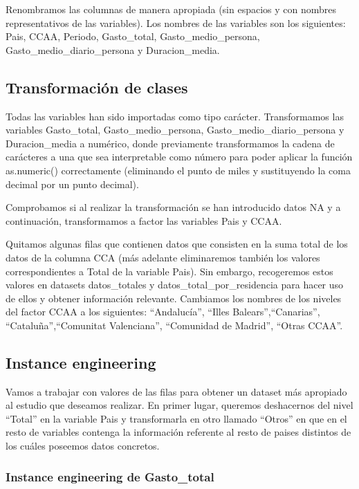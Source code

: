 \documentclass[data,article,submit,moreauthors,pdftex]{Definitions/mdpi}
\begin{document}
Renombramos las columnas de manera apropiada (sin espacios y con nombres
representativos de las variables). Los nombres de las variables son los
siguientes: Pais, CCAA, Periodo, Gasto\_total, Gasto\_medio\_persona,
Gasto\_medio\_diario\_persona y Duracion\_media.

\subsection{Transformación de clases}\label{transformaciuxf3n-de-clases}

Todas las variables han sido importadas como tipo carácter.
Transformamos las variables Gasto\_total, Gasto\_medio\_persona,
Gasto\_medio\_diario\_persona y Duracion\_media a numérico, donde
previamente transformamos la cadena de carácteres a una que sea
interpretable como número para poder aplicar la función as.numeric()
correctamente (eliminando el punto de miles y sustituyendo la coma
decimal por un punto decimal).

Comprobamos si al realizar la transformación se han introducido datos NA
y a continuación, transformamos a factor las variables Pais y CCAA.

Quitamos algunas filas que contienen datos que consisten en la suma
total de los datos de la columna CCA (más adelante eliminaremos también
los valores correspondientes a Total de la variable Pais). Sin embargo,
recogeremos estos valores en datasets datos\_totales y
datos\_total\_por\_residencia para hacer uso de ellos y obtener
información relevante. Cambiamos los nombres de los niveles del factor
CCAA a los siguientes: ``Andalucía'', ``Illes Balears'',``Canarias'',
``Cataluña'',``Comunitat Valenciana'', ``Comunidad de Madrid'', ``Otras
CCAA''.

\subsection{Instance engineering}\label{instance-engineering}

Vamos a trabajar con valores de las filas para obtener un dataset más
apropiado al estudio que deseamos realizar. En primer lugar, queremos
deshacernos del nivel ``Total'' en la variable Pais y transformarla en
otro llamado ``Otros'' en que en el resto de variables contenga la
información referente al resto de paises distintos de los cuáles
poseemos datos concretos.

\subsubsection{Instance engineering de
Gasto\_total}\label{instance-engineering-de-gasto_total}
\end{document}
